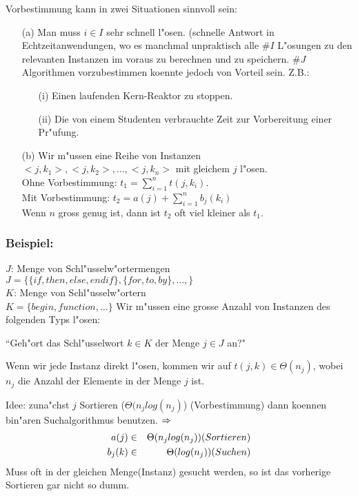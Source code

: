 \documentclass[a4paper,twoside,DIV15,BCOR12mm]{scrbook}
\begin{document}
Vorbestimmung kann in zwei Situationen sinnvoll sein:
\begin{itemize}
\item[(a)] Man muss $i\in I$ sehr schnell l"osen. (schnelle Antwort in Echtzeitanwendungen, wo es manchmal unpraktisch alle $\#I$ L"osungen zu den relevanten Instanzen im voraus zu berechnen und zu speichern. $\#J$ Algorithmen vorzubestimmen koennte jedoch von Vorteil sein. Z.B.: 
	\begin{itemize}
		\item[(i)] Einen laufenden Kern-Reaktor zu stoppen.
		\item[(ii)] Die von einem Studenten verbrauchte Zeit zur Vorbereitung einer Pr"ufung.	
	\end{itemize}
\item[(b)] Wir m"ussen eine Reihe von Instanzen $<j,k_1>,<j,k_2>,\dots,<j,k_n>$ mit gleichem $j$ l"osen.\\
	Ohne Vorbestimmung: $t_1=\sum_{i=1}^{n}t(j,k_i)$. \\
	Mit Vorbestimmung: $t_2=a(j)+\sum_{i=1}^{n}b_j(k_i)$ \\
	Wenn $n$ gross genug ist, dann ist $t_2$ oft viel kleiner als $t_1$.
\end{itemize}
\subsubsection*{Beispiel:}
 $J$: Menge von Schl"usselw"ortermengen\\
 $J=\{\{if,then,else,endif\},\{for,to,by\},\dots,\}$\\
 $K$: Menge von Schl"usselw"ortern\\
 $K=\{begin,function,\dots\}$
Wir m"ussen eine grosse Anzahl von Instanzen des folgenden Typs l"osen:
\begin{center}
	``Geh"ort das Schl"usselwort $k\in K$ der Menge $j\in J$ an?"
\end{center}

Wenn wir jede Instanz direkt l"osen, kommen wir auf $t(j,k)\in \Theta(n_j)$, wobei $n_j$ die Anzahl der Elemente in der Menge $j$ ist.

Idee: zuna"chst $j$ Sortieren ($\Theta(n_jlog(n_j)$) (Vorbestimmung) dann koennen bin"aren Suchalgorithmus benutzen. $\Rightarrow$
\begin{eqnarray*}
	 a(j)  &\in& \Theta(n_j log(n_j))  \text(Sortieren)\\
	 b_j(k)&\in& \Theta(log(n_j))      \text(Suchen) \\
\end{eqnarray*}
Muss oft in der gleichen Menge(Instanz) gesucht werden, so ist das vorherige Sortieren gar nicht so dumm.
\end{document}
